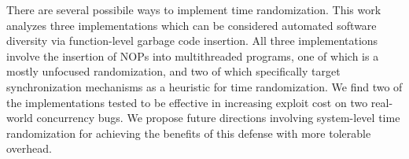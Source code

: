 There are several possibile ways to implement time randomization.
This work analyzes three implementations which can be considered automated software diversity via function-level garbage code insertion.
All three implementations involve the insertion of NOPs into multithreaded programs, one of which is a mostly unfocused randomization, and two of which specifically target synchronization mechanisms as a heuristic for time randomization.
We find two of the implementations tested to be effective in increasing exploit cost on two real-world concurrency bugs.
We propose future directions involving system-level time randomization for achieving the benefits of this defense with more tolerable overhead.
